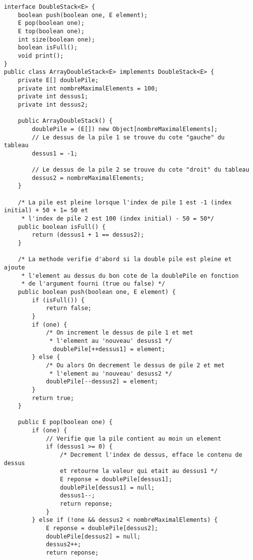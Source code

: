 \documentclass[10pt]{report}
\begin{document}
    \begin{lstlisting}[style=JavaDraculaWhite]
 interface DoubleStack<E> {
    boolean push(boolean one, E element);
    E pop(boolean one);
    E top(boolean one);
    int size(boolean one);
    boolean isFull();
    void print();
}      
public class ArrayDoubleStack<E> implements DoubleStack<E> {
    private E[] doublePile;
    private int nombreMaximalElements = 100;
    private int dessus1;
    private int dessus2;

    public ArrayDoubleStack() {
        doublePile = (E[]) new Object[nombreMaximalElements];
        // Le dessus de la pile 1 se trouve du cote "gauche" du tableau
        dessus1 = -1;

        // Le dessus de la pile 2 se trouve du cote "droit" du tableau
        dessus2 = nombreMaximalElements;
    }

    /* La pile est pleine lorsque l'index de pile 1 est -1 (index initial) + 50 + 1= 50 et 
     * l'index de pile 2 est 100 (index initial) - 50 = 50*/
    public boolean isFull() {
        return (dessus1 + 1 == dessus2);
    }

    /* La methode verifie d'abord si la double pile est pleine et ajoute 
     * l'element au dessus du bon cote de la doublePile en fonction 
     * de l'argument fourni (true ou false) */
    public boolean push(boolean one, E element) {
        if (isFull()) {
            return false;
        }
        if (one) {
            /* On increment le dessus de pile 1 et met 
             * l'element au 'nouveau' desuss1 */
              doublePile[++dessus1] = element;
        } else {
            /* Ou alors On decrement le dessus de pile 2 et met 
             * l'element au 'nouveau' desuss2 */
            doublePile[--dessus2] = element;
        }
        return true;
    }
    
    public E pop(boolean one) {
        if (one) {
            // Verifie que la pile contient au moin un element
            if (dessus1 >= 0) {
                /* Decrement l'index de dessus, efface le contenu de dessus 
                et retourne la valeur qui etait au dessus1 */ 
                E reponse = doublePile[dessus1];
                doublePile[dessus1] = null; 
                dessus1--; 
                return reponse;
            }
        } else if (!one && dessus2 < nombreMaximalElements) {
            E reponse = doublePile[dessus2]; 
            doublePile[dessus2] = null;
            dessus2++;
            return reponse;  
            

\end{lstlisting}
\end{document}
